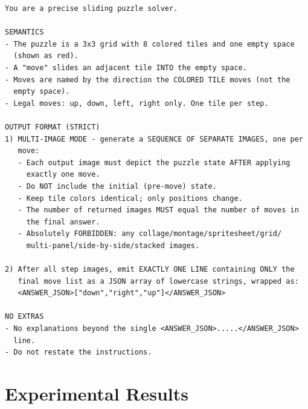 \documentclass{article}
\theoremstyle{plain}
\theoremstyle{definition}
\theoremstyle{remark}
\begin{document}
\begin{verbatim}
You are a precise sliding puzzle solver.

SEMANTICS
- The puzzle is a 3x3 grid with 8 colored tiles and one empty space
  (shown as red).
- A "move" slides an adjacent tile INTO the empty space.
- Moves are named by the direction the COLORED TILE moves (not the
  empty space).
- Legal moves: up, down, left, right only. One tile per step.

OUTPUT FORMAT (STRICT)
1) MULTI-IMAGE MODE - generate a SEQUENCE OF SEPARATE IMAGES, one per
   move:
   - Each output image must depict the puzzle state AFTER applying
     exactly one move.
   - Do NOT include the initial (pre-move) state.
   - Keep tile colors identical; only positions change.
   - The number of returned images MUST equal the number of moves in
     the final answer.
   - Absolutely FORBIDDEN: any collage/montage/spritesheet/grid/
     multi-panel/side-by-side/stacked images.

2) After all step images, emit EXACTLY ONE LINE containing ONLY the
   final move list as a JSON array of lowercase strings, wrapped as:
   <ANSWER_JSON>["down","right","up"]</ANSWER_JSON>

NO EXTRAS
- No explanations beyond the single <ANSWER_JSON>.....</ANSWER_JSON>
  line.
- Do not restate the instructions.
\end{verbatim}


\section{Experimental Results}
\end{document}
